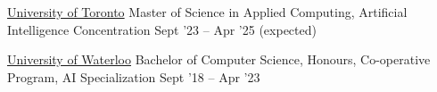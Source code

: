 

\headedsection %
{\href{https://www.utoronto.ca/}{University of Toronto}}
{\textsc{}} {
\headedsubsection %
{Master of Science in Applied Computing, Artificial Intelligence Concentration}
{Sept '23 -- Apr '25 (expected)}
{}
}

\headedsection %
{\href{https://uwaterloo.ca/}{University of Waterloo}}
{\textsc{}} {
\headedsubsection %
{Bachelor of Computer Science, Honours, Co-operative Program, AI Specialization}
{Sept '18 -- Apr '23}
{}
}
